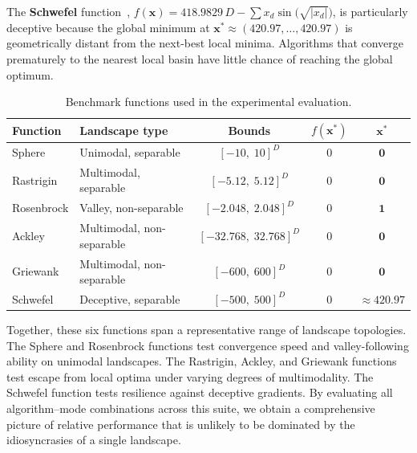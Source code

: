 The \textbf{Schwefel} function~\cite{Schwefel1981},
$f(\mathbf{x}) = 418.9829\,D - \sum x_d\sin\!\bigl(\sqrt{|x_d|}\bigr)$,
is particularly deceptive because the global minimum at
$\mathbf{x}^* \approx (420.97,\ldots,420.97)$ is geometrically distant from
the next-best local minima.  Algorithms that converge prematurely to the
nearest local basin have little chance of reaching the global optimum.

\begin{table}[t]
\centering
\caption{Benchmark functions used in the experimental evaluation.}
\label{tab:benchmarks}
\begin{tabular}{llccc}
\toprule
\textbf{Function} & \textbf{Landscape type} & \textbf{Bounds}
  & \textbf{$f(\mathbf{x}^*)$} & \textbf{$\mathbf{x}^*$} \\
\midrule
Sphere     & Unimodal, separable
  & $[-10,\; 10]^D$         & 0 & $\mathbf{0}$ \\
Rastrigin  & Multimodal, separable
  & $[-5.12,\; 5.12]^D$     & 0 & $\mathbf{0}$ \\
Rosenbrock & Valley, non-separable
  & $[-2.048,\; 2.048]^D$   & 0 & $\mathbf{1}$ \\
Ackley     & Multimodal, non-separable
  & $[-32.768,\; 32.768]^D$ & 0 & $\mathbf{0}$ \\
Griewank   & Multimodal, non-separable
  & $[-600,\; 600]^D$       & 0 & $\mathbf{0}$ \\
Schwefel   & Deceptive, separable
  & $[-500,\; 500]^D$       & 0 & $\approx 420.97$ \\
\bottomrule
\end{tabular}
\end{table}

Together, these six functions span a representative range of landscape
topologies.  The Sphere and Rosenbrock functions test convergence speed and
valley-following ability on unimodal landscapes.  The Rastrigin, Ackley, and
Griewank functions test escape from local optima under varying degrees of
multimodality.  The Schwefel function tests resilience against deceptive
gradients.  By evaluating all algorithm--mode combinations across this suite,
we obtain a comprehensive picture of relative performance that is unlikely to
be dominated by the idiosyncrasies of a single landscape.
